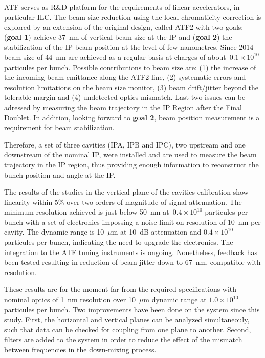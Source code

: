 ATF serves as R\&D platform for the requirements of linear accelerators, in particular ILC. The beam size reduction using the local chromaticity correction is explored by an extension of the original design, called ATF2 with two goals: ({\textbf{goal 1}}) achieve 37~nm of vertical beam size at the IP and ({\textbf{goal 2}}) the stabilization of the IP beam position at the level of few nanometres. Since 2014 beam size of 44~nm are achieved as a regular basis at charges of about~$0.1\times10^{10}$ particules per bunch. Possible contributions to beam size are: (1) the increase of the incoming beam emittance along the ATF2 line, (2) systematic errors and resolution limitations on the beam size monitor, (3) beam drift/jitter beyond the tolerable margin and  (4) undetected optics mismatch. Last two issues can be adressed by measuring the beam trajectory in the IP Region after the Final Doublet. In addition, looking forward to \textbf{goal 2}, beam position measurement is a requirement for beam stabilization.\par
Therefore, a set of three cavities (IPA, IPB and IPC), two upstream and one downstream of the nominal IP, were installed and are used to measure the beam trajectory in the IP region, thus providing enough information to reconstruct the bunch position and angle at the IP.\par
The results of the studies in the vertical plane of the cavities calibration show linearity within 5\% over two orders of magnitude of signal attenuation. The minimum resolution achieved is just below 50~nm at~$0.4\times10^{10}$ particules per bunch with a set of electronics impossing a noise limit on resolution of 10~nm per cavity. The dynamic range is 10~$\mu$m at 10~dB attenuation and $0.4\times10^{10}$ particules per bunch, indicating the need to upgrade the electronics. The integration to the ATF tuning instruments is ongoing. Nonetheless, feedback has been tested resulting in reduction of beam jitter down to 67~nm, compatible with resolution.\par
These results are for the moment far from the required specifications with nominal optics of 1~nm resolution over 10~$\mu$m dynamic range at $1.0\times10^{10}$ particules per bunch. Two improvements have been done on the system since this study. First, the horizontal and vertical planes can be analyzed simultaneouly, such that data can be checked for coupling from one plane to another. Second, filters are added to the system in order to reduce the effect of the mismatch between frequencies in the down-mixing process.\par
